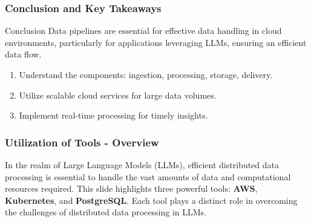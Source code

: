 \documentclass[aspectratio=169]{beamer}
\begin{document}
\begin{frame}[fragile]
    \frametitle{Conclusion and Key Takeaways}
    \begin{block}{Conclusion}
        Data pipelines are essential for effective data handling in cloud environments, particularly for applications leveraging LLMs, ensuring an efficient data flow.
    \end{block}

    \begin{enumerate}
        \item Understand the components: ingestion, processing, storage, delivery.
        \item Utilize scalable cloud services for large data volumes.
        \item Implement real-time processing for timely insights.
    \end{enumerate}
\end{frame}

\begin{frame}[fragile]
    \frametitle{Utilization of Tools - Overview}
    In the realm of Large Language Models (LLMs), efficient distributed data processing is essential to handle the vast amounts of data and computational resources required. 
    This slide highlights three powerful tools: \textbf{AWS}, \textbf{Kubernetes}, and \textbf{PostgreSQL}. Each tool plays a distinct role in overcoming the challenges of distributed data processing in LLMs.
\end{frame}
\end{document}
